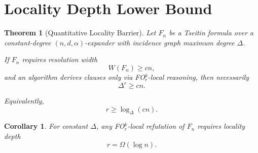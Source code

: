 \documentclass{article}
\newtheorem{theorem}{Theorem}
\newtheorem{corollary}{Corollary}
\begin{document}
\section{Locality Depth Lower Bound}

\begin{theorem}[Quantitative Locality Barrier]
Let $F_n$ be a Tseitin formula over a constant-degree
$(n,d,\alpha)$-expander with incidence graph
maximum degree $\Delta$.

If $F_n$ requires resolution width
\[
W(F_n) \ge c n,
\]
and an algorithm derives clauses only via
FO$^k_r$-local reasoning,
then necessarily
\[
\Delta^r \ge c n.
\]

Equivalently,
\[
r \ge \log_\Delta (c n).
\]
\end{theorem}

\begin{corollary}
For constant $\Delta$,
any FO$^k_r$-local refutation of $F_n$
requires locality depth
\[
r = \Omega(\log n).
\]
\end{corollary}
\end{document}
